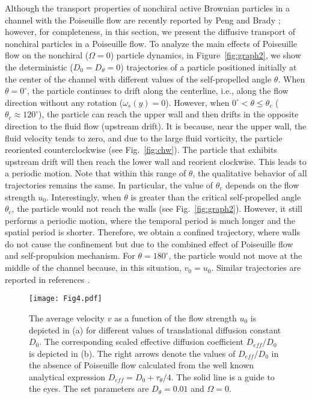 \documentclass[aps,pre,preprint,superscriptaddress,amsmath,amssymb,nofootinbib]{revtex4}
\begin{document}
Although the transport properties of nonchiral active Brownian particles in a channel with the Poiseuille flow are recently reported  by  Peng and Brady \cite{Peng_PRF}; however, for completeness, in this section, we present 
the diffusive transport of nonchiral particles in a Poiseuille flow.
To analyze the main effects of Poiseuille flow on the nonchiral ($\Omega = 0$) particle  dynamics, in Figure~\ref{fig:graph2}, we show the deterministic ($D_0 = D_\theta = 0$) trajectories of a particle positioned initially at the center of the channel with different values of the self-propelled angle $\theta$. 
When $\theta = 0^{\circ}$, the particle continues to drift along the centerline, i.e., along the flow direction without any rotation ($\omega_s(y) = 0$). 
However, when $0^{\circ} < \theta \leq \theta_c$ ($\theta_c \approx 120^{\circ}$), the particle can reach the upper wall and then drifts in the opposite direction to the fluid flow (upstream drift). 
It is because, near the upper wall, the fluid velocity tends to zero, and due to the large fluid vorticity, the particle reoriented counterclockwise (see Fig.~\ref{fig:chw}). 
The particle that exhibits upstream drift will then reach the lower wall and reorient clockwise.
This leads to a periodic motion.
Note that within this range of $\theta$, the qualitative behavior of all trajectories remains the same. 
In particular, the value of $\theta_c$ depends on the flow strength $u_0$.
Interestingly, when $\theta$ is greater than the critical self-propelled angle $\theta_c$, the particle would not reach the walls (see Fig.~\ref{fig:graph2}). 
However, it still performs a periodic motion, where the temporal period is much longer and the spatial period is shorter. 
Therefore, we obtain a confined trajectory, where walls do not cause the confinement but due to the combined effect of Poiseuille flow and self-propulsion mechanism.
For $\theta = 180^{\circ}$, the particle would not move at the middle of the channel because, in this situation, $v_0 = u_0$.
Similar trajectories are reported in references \cite{Peng_PRF, Zottl_Stark@PRL:2012, Costanzo_JPCM}.

\begin{figure}[t]
\centering
\texttt{[image: Fig4.pdf]}
\caption{The average velocity $v$ as a function of the flow strength $u_0$ is depicted in (a) for different values of translational diffusion constant $D_0$. 
The corresponding scaled effective diffusion coefficient $D_{eff}/D_0$ is depicted in (b). 
The right arrows denote the values of $D_{eff}/D_0$ in the absence of Poiseuille flow calculated from the well known analytical expression $D_{eff} = D_0 +  \tau_\theta/4$.
The solid line is a guide to the eyes. The set parameters are $D_\theta = 0.01$ and $\Omega = 0$.}
\label{fig:graph4}
\end{figure} 
\end{document}
